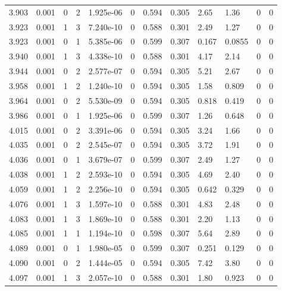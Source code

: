 \documentclass[preview]{standalone}
\begin{document}
{{{{{{{{{\begin{tabular}{L{1.2cm}C{1.2cm} C{0.3cm}C{0.5cm} C{1.4cm}C{1.4cm} C{1.4cm}C{1.4cm} C{1.6cm}C{1.6cm} C{1.6cm}C{1.6cm}}
  3.903  &  0.001  & 0     &  2 &  1.925e-06  & 0  &  0.594&   0.305& 2.65 & 1.36   &  0 & 0  \\ 
  3.923  &  0.001  & 1     &  3 &  7.240e-10  & 0  &  0.588&   0.301& 2.49 & 1.27   &  0 & 0  \\ 
  3.923  &  0.001  & 0     &  1 &  5.385e-06  & 0  &  0.599&   0.307& 0.167 & 0.0855   &  0 & 0  \\ 
  3.940  &  0.001  & 1     &  3 &  4.338e-10  & 0  &  0.588&   0.301& 4.17 & 2.14   &  0 & 0  \\ 
  3.944  &  0.001  & 0     &  2 &  2.577e-07  & 0  &  0.594&   0.305& 5.21 & 2.67   &  0 & 0  \\ 
  3.958  &  0.001  & 1     &  2 &  1.240e-10  & 0  &  0.594&   0.305& 1.58 & 0.809   &  0 & 0  \\ 
  3.964  &  0.001  & 0     &  2 &  5.530e-09  & 0  &  0.594&   0.305& 0.818 & 0.419   &  0 & 0  \\ 
  3.986  &  0.001  & 0     &  1 &  1.925e-06  & 0  &  0.599&   0.307& 1.26 & 0.648   &  0 & 0  \\ 
  4.015  &  0.001  & 0     &  2 &  3.391e-06  & 0  &  0.594&   0.305& 3.24 & 1.66   &  0 & 0  \\ 
  4.035  &  0.001  & 0     &  2 &  2.545e-07  & 0  &  0.594&   0.305& 3.72 & 1.91   &  0 & 0  \\ 
  4.036  &  0.001  & 0     &  1 &  3.679e-07  & 0  &  0.599&   0.307& 2.49 & 1.27   &  0 & 0  \\ 
  4.038  &  0.001  & 1     &  2 &  2.593e-10  & 0  &  0.594&   0.305& 4.69 & 2.40   &  0 & 0  \\ 
  4.059  &  0.001  & 1     &  2 &  2.256e-10  & 0  &  0.594&   0.305& 0.642 & 0.329   &  0 & 0  \\ 
  4.076  &  0.001  & 1     &  3 &  1.597e-10  & 0  &  0.588&   0.301& 4.83 & 2.48   &  0 & 0  \\ 
  4.083  &  0.001  & 1     &  3 &  1.869e-10  & 0  &  0.588&   0.301& 2.20 & 1.13   &  0 & 0  \\ 
  4.085  &  0.001  & 1     &  1 &  1.194e-10  & 0  &  0.598&   0.307& 5.64 & 2.89   &  0 & 0  \\ 
  4.089  &  0.001  & 0     &  1 &  1.980e-05  & 0  &  0.599&   0.307& 0.251 & 0.129   &  0 & 0  \\ 
  4.090  &  0.001  & 0     &  2 &  1.444e-05  & 0  &  0.594&   0.305& 7.42 & 3.80   &  0 & 0  \\ 
  4.097  &  0.001  & 1     &  3 &  2.057e-10  & 0  &  0.588&   0.301& 1.80 & 0.923   &  0 & 0  \\ 

\end{tabular}}}}}}}}}}
\end{document}
